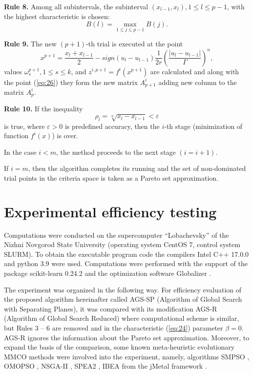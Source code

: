 \documentclass[runningheads]{llncs}
\begin{document}
\textbf{Rule 8.} Among all subintervals, the subinterval $(x_{l-1}, x_l), 1 \leq l \leq p-1$, with the highest characteristic is chosen:
\begin{equation}
    \label{eq:25}
    B(l) = \max_{1 \leq j \leq p-1} {B(j)}.
\end{equation}

\textbf{Rule 9.} The new $(p+1)$-th trial is executed at the point  
\begin{equation}
    \label{eq:26}
    x^{p+1} = \frac{x_l + x_{l-1}}{2} - sign(u_l - u_{l-1}) \frac{1}{2r} \left(\frac{|u_l - u_{l-1}|}{\Gamma} \right)^n,
\end{equation}
values $\omega^{p+1}_s, 1 \leq s \leq k$, and $z^{i,p+1}=f^i(x^{p+1})$  are calculated and along with the point (\ref{eq:26}) they form the new matrix $A^i_{p+1}$ adding new column to the matrix $A^i_p$. 

\textbf{Rule 10.} If the inequality
\begin{equation}
    \label{eq:27}
    \rho_l=\sqrt[n]{x_l-x_{l-1}} < \varepsilon
\end{equation}
is true, where $\varepsilon > 0$ is predefined accuracy, then the $i$-th  stage (minimization of function $f^i(x)$) is over.

In the case $i < m$, the method proceeds to the next stage $(i = i+1)$.  

If $i=m$, then the algorithm completes its running and the set of non-dominated trial points in the criteria space is taken as a Pareto set approximation.

\section{Experimental efficiency testing}\label{sec:4}

Computations were conducted on the supercomputer ``Lobachevsky'' of the Nizhni Novgorod State University (operating system CentOS 7, control system SLURM). %
To obtain the executable program code the compilers Intel C++ 17.0.0 and python 3.9 were used. Computations were performed with the support of the package scikit-learn 0.24.2 and the optimization software Globalizer \cite{globalizerSystem}.

The experiment was organized in the following way. For efficiency evaluation of the proposed algorithm hereinafter called AGS-SP (Algorithm of Global Search with Separating Planes), it was compared with its modification AGS-R (Algorithm of Global Search Reduced) where computational scheme is similar, but Rules 3 -- 6 are removed and in the characteristic (\ref{eq:24}) parameter $\beta = 0$. AGS-R ignores the information about the Pareto set approximation. Moreover, to expand the basis of the comparison, some known meta-heuristic evolutionary MMCO methods were involved into the experiment, namely, algorithms SMPSO \cite{NDG09}, OMOPSO \cite{RC05}, NSGA-II \cite{DPA02}, SPEA2 \cite{ZLT01}, IBEA \cite{ZK04} from the jMetal framework \cite{DNA10}.
\end{document}
